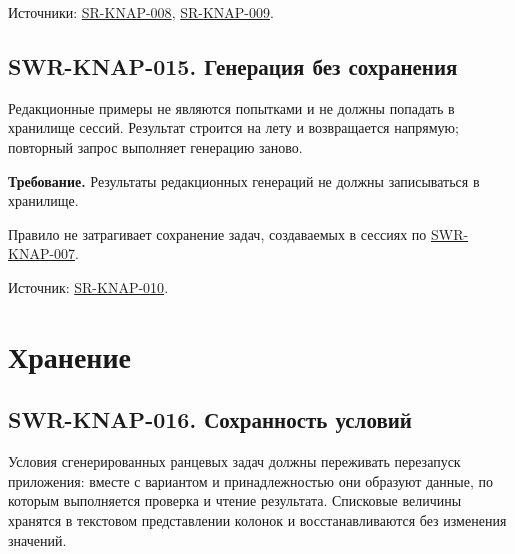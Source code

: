 \documentclass[12pt,a4paper]{article}
\begin{document}
Источники: {\href{../04\_Системные\_требования/DOC-05\_Системные\_требования.pdf\#sr-knap-008}{SR-KNAP-008}}, {\href{../04\_Системные\_требования/DOC-05\_Системные\_требования.pdf\#sr-knap-009}{SR-KNAP-009}}.

\subsection{SWR-KNAP-015. Генерация без сохранения}\label{swr-knap-015-ux433ux435ux43dux435ux440ux430ux446ux438ux44f-ux431ux435ux437-ux441ux43eux445ux440ux430ux43dux435ux43dux438ux44f}

\hypertarget{swr-knap-015-генерация-без-сохранения}{}

\hypertarget{swr-knap-015}{}

Редакционные примеры не являются попытками и не должны попадать в хранилище сессий. Результат строится на лету и возвращается напрямую; повторный запрос выполняет генерацию заново.

\textbf{Требование.} Результаты редакционных генераций не должны записываться в хранилище.

Правило не затрагивает сохранение задач, создаваемых в сессиях по {\hyperlink{swr-knap-007}{SWR-KNAP-007}}.

Источник: {\href{../04\_Системные\_требования/DOC-05\_Системные\_требования.pdf\#sr-knap-010}{SR-KNAP-010}}.

\section{Хранение}\label{6-ux445ux440ux430ux43dux435ux43dux438ux435}

\hypertarget{6-хранение}{}

\subsection{SWR-KNAP-016. Сохранность условий}\label{swr-knap-016-ux441ux43eux445ux440ux430ux43dux43dux43eux441ux442ux44c-ux443ux441ux43bux43eux432ux438ux439}

\hypertarget{swr-knap-016-сохранность-условий}{}

\hypertarget{swr-knap-016}{}

Условия сгенерированных ранцевых задач должны переживать перезапуск приложения: вместе с вариантом и принадлежностью они образуют данные, по которым выполняется проверка и чтение результата. Списковые величины хранятся в текстовом представлении колонок и восстанавливаются без изменения значений.
\end{document}
